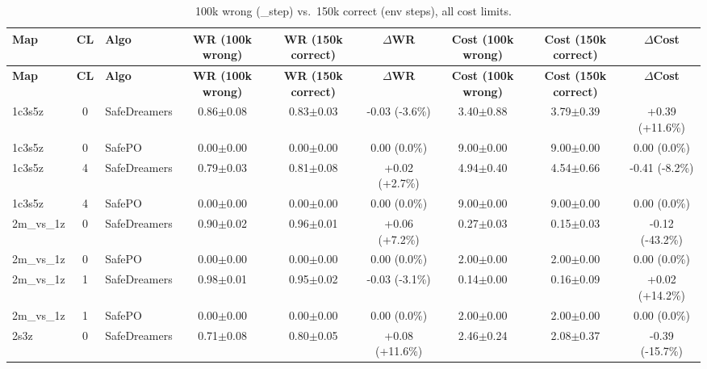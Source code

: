 \documentclass{article}
\begin{document}
\begin{longtable}{lclcccccc}
\caption{100k wrong (\_step) vs.\ 150k correct (env steps), all cost limits.} \\
\toprule
\textbf{Map} & \textbf{CL} & \textbf{Algo} & \textbf{WR (100k wrong)} & \textbf{WR (150k correct)} & \textbf{$\Delta$WR} & \textbf{Cost (100k wrong)} & \textbf{Cost (150k correct)} & \textbf{$\Delta$Cost} \\
\midrule\endfirsthead
\toprule
\textbf{Map} & \textbf{CL} & \textbf{Algo} & \textbf{WR (100k wrong)} & \textbf{WR (150k correct)} & \textbf{$\Delta$WR} & \textbf{Cost (100k wrong)} & \textbf{Cost (150k correct)} & \textbf{$\Delta$Cost} \\
\midrule\endhead
1c3s5z & 0 & SafeDreamers & 0.86$\pm$0.08 & 0.83$\pm$0.03 & \textcolor{red!40!black}{-0.03 (-3.6\%)} & 3.40$\pm$0.88 & 3.79$\pm$0.39 & \textcolor{red!55!black}{+0.39 (+11.6\%)} \\
1c3s5z & 0 & SafePO & 0.00$\pm$0.00 & 0.00$\pm$0.00 & \textcolor{red!40!black}{0.00 (0.0\%)} & 9.00$\pm$0.00 & 9.00$\pm$0.00 & \textcolor{green!40!black}{0.00 (0.0\%)} \\
1c3s5z & 4 & SafeDreamers & 0.79$\pm$0.03 & 0.81$\pm$0.08 & \textcolor{green!40!black}{+0.02 (+2.7\%)} & 4.94$\pm$0.40 & 4.54$\pm$0.66 & \textcolor{green!55!black}{-0.41 (-8.2\%)} \\
1c3s5z & 4 & SafePO & 0.00$\pm$0.00 & 0.00$\pm$0.00 & \textcolor{red!40!black}{0.00 (0.0\%)} & 9.00$\pm$0.00 & 9.00$\pm$0.00 & \textcolor{green!40!black}{0.00 (0.0\%)} \\
\midrule
2m\_vs\_1z & 0 & SafeDreamers & 0.90$\pm$0.02 & 0.96$\pm$0.01 & \textcolor{green!55!black}{+0.06 (+7.2\%)} & 0.27$\pm$0.03 & 0.15$\pm$0.03 & \textcolor{green!85!black}{-0.12 (-43.2\%)} \\
2m\_vs\_1z & 0 & SafePO & 0.00$\pm$0.00 & 0.00$\pm$0.00 & \textcolor{red!40!black}{0.00 (0.0\%)} & 2.00$\pm$0.00 & 2.00$\pm$0.00 & \textcolor{green!40!black}{0.00 (0.0\%)} \\
2m\_vs\_1z & 1 & SafeDreamers & 0.98$\pm$0.01 & 0.95$\pm$0.02 & \textcolor{red!40!black}{-0.03 (-3.1\%)} & 0.14$\pm$0.00 & 0.16$\pm$0.09 & \textcolor{red!55!black}{+0.02 (+14.2\%)} \\
2m\_vs\_1z & 1 & SafePO & 0.00$\pm$0.00 & 0.00$\pm$0.00 & \textcolor{red!40!black}{0.00 (0.0\%)} & 2.00$\pm$0.00 & 2.00$\pm$0.00 & \textcolor{green!40!black}{0.00 (0.0\%)} \\
\midrule
2s3z & 0 & SafeDreamers & 0.71$\pm$0.08 & 0.80$\pm$0.05 & \textcolor{green!55!black}{+0.08 (+11.6\%)} & 2.46$\pm$0.24 & 2.08$\pm$0.37 & \textcolor{green!70!black}{-0.39 (-15.7\%)} \\

\end{longtable}
\end{document}
